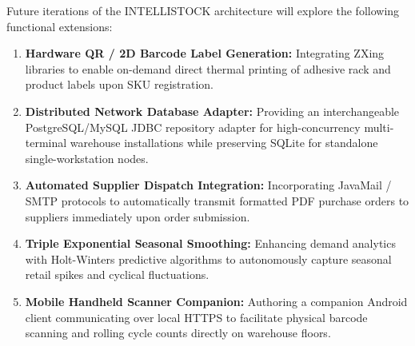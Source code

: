 \documentclass[BTech]{srmuthesis}
\begin{document}
Future iterations of the INTELLISTOCK architecture will explore the following functional extensions:
\begin{enumerate}
    \item \textbf{Hardware QR / 2D Barcode Label Generation:} Integrating ZXing libraries to enable on-demand direct thermal printing of adhesive rack and product labels upon SKU registration.
    \item \textbf{Distributed Network Database Adapter:} Providing an interchangeable PostgreSQL/MySQL JDBC repository adapter for high-concurrency multi-terminal warehouse installations while preserving SQLite for standalone single-workstation nodes.
    \item \textbf{Automated Supplier Dispatch Integration:} Incorporating JavaMail / SMTP protocols to automatically transmit formatted PDF purchase orders to suppliers immediately upon order submission.
    \item \textbf{Triple Exponential Seasonal Smoothing:} Enhancing demand analytics with Holt-Winters predictive algorithms to autonomously capture seasonal retail spikes and cyclical fluctuations.
    \item \textbf{Mobile Handheld Scanner Companion:} Authoring a companion Android client communicating over local HTTPS to facilitate physical barcode scanning and rolling cycle counts directly on warehouse floors.
\end{enumerate}
\end{document}
